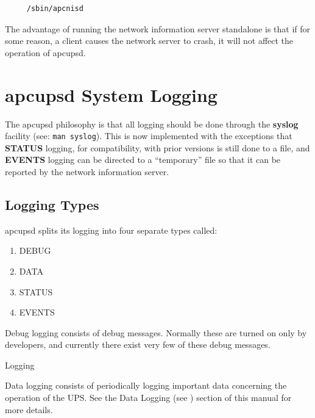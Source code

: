 {{{{{{{{{{\begin{verbatim}
     /sbin/apcnisd
\end{verbatim}
\normalsize

The advantage of running the network information server standalone is that if
for some reason, a client causes the network server to crash, it will not
affect the operation of apcupsd. 

\label{apcupsd-System-Logging}

\section*{apcupsd System Logging}

\label{index-Logging_002c-System-166}
\label{index-System-Logging-167}
The apcupsd philosophy is that all logging should be done through the {\bf
syslog} facility (see: {\tt man syslog}). This is now implemented with the
exceptions that {\bf STATUS} logging, for compatibility, with prior versions
is still done to a file, and {\bf EVENTS} logging can be directed to a
``temporary'' file so that it can be reported by the network information
server. 

\label{Logging-Types}

\subsection*{Logging Types}

\label{index-Logging_002c-types-168}
apcupsd splits its logging into four separate types called:  

\begin{enumerate}
\item DEBUG  
\item DATA  
\item STATUS  
\item EVENTS  
   \end{enumerate}

Debug logging consists of debug messages. Normally these are turned on only by
developers, and currently there exist very few of these debug messages. 

{\smallDATA Logging}

Data logging consists of periodically logging important data concerning the
operation of the UPS. See the Data Logging (see 
) section of this manual for more
details. 

}}}}}}}}}}
